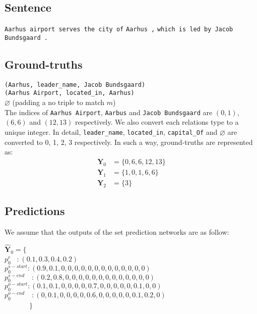 \documentclass[letterpaper]{article} \usepackage{aaai21}  \usepackage{times}  \usepackage{helvet} \usepackage{courier}  \usepackage[hyphens]{url}  \usepackage{graphicx} \usepackage{amsfonts,amssymb}
\begin{document}
\subsection{Sentence}
\texttt{Aarhus airport serves the city of} \texttt{Aarhus ,}  \texttt{which is led by Jacob Bundsgaard .}
\\

\subsection{Ground-truths}
\texttt{(Aarhus, leader\_name, Jacob Bundsgaard)} \\
\texttt{(Aarhus Airport, located\_in, Aarhus)} \\
$\varnothing$ (padding a no triple to match $m$) \\

\noindent The indices of \texttt{Aarhus Airport}, \texttt{Aarbus} and \texttt{Jacob Bundsgaard} are $(0, 1)$, $(6, 6)$ and $(12, 13)$ respectively. We also convert each relations type to a unique integer. In detail, \texttt{leader\_name}, \texttt{located\_in},  \texttt{capital\_Of} and  $\varnothing$ are converted to 0, 1, 2, 3 respectively. In such a way, ground-truths are represented as: \\
\begin{equation*}
\begin{split}
\mathbf{Y}_0 &= \{0, 6, 6, 12, 13\} \\
\mathbf{Y}_1 &= \{1, 0, 1, 6, 6\} \\
\mathbf{Y}_2 & = \{3\}
\end{split}
\end{equation*}

\subsection{Predictions}

We assume that the outputs of the set prediction networks are as follow: 

\noindent $\hat{\mathbf{Y}}_0 = \{$ \\
\indent \quad \quad $p_0^r$ \quad   \quad\, :$\ (0.1, 0.3, 0.4, 0.2)$
\\
\indent \quad \quad   $p_0^{s-start}: (0.9, 0.1, 0, 0, 0, 0,0, 0, 0, 0, 0, 0, 0, 0, 0)$\\
\indent \quad \quad  $p_0^{s-end}\quad\!\!\! : (0.2, 0.8, 0, 0, 0, 0, 0, 0, 0, 0, 0, 0, 0, 0, 0)$\\
\indent \quad \quad   $p_0^{o-start}: (0.1, 0.1, 0, 0, 0, 0, 0.7, 0, 0, 0, 0, 0, 0.1, 0, 0)$\\
\indent \quad \quad $p_0^{o-end}\quad\!\!\! : (0, 0.1, 0, 0, 0, 0, 0.6, 0, 0, 0, 0, 0, 0.1, 0.2, 0)$\\
\indent \ \ \ \ \ \ \  $\}$ \\
\end{document}
